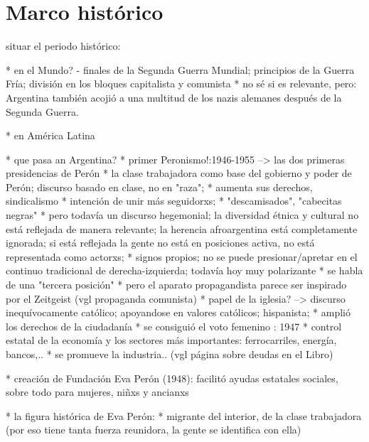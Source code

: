 \section{Marco histórico}

situar el periodo histórico:

* en el Mundo? - finales de la Segunda Guerra Mundial; principios de la Guerra Fría; división en los bloques capitalista y comunista
  * no sé si es relevante, pero: Argentina también acojió a una multitud de los nazis alemanes después de la Segunda Guerra.

* en América Latina

* que pasa an Argentina?
  * primer Peronismo!:1946-1955 --> las dos primeras presidencias de Perón
    * la clase trabajadora como base del gobierno y poder de Perón; discurso basado en clase, no en "raza";
      * aumenta sus derechos, sindicalismo
    * intención de unir más seguidorxs;
    * "descamisados", "cabecitas negras"
    * pero todavía un discurso hegemonial; la diversidad étnica y cultural no está reflejada de manera relevante; la herencia afroargentina está completamente ignorada; si está reflejada la gente no está en posiciones activa, no está representada como actorxs;
    * signos propios; no se puede presionar/apretar en el continuo tradicional de derecha-izquierda; todavía hoy muy polarizante
      * se habla de una "tercera posición"
    * pero el aparato propagandista parece ser inspirado por el Zeitgeist (vgl propaganda comunista)
    * papel de la iglesia? --> discurso inequívocamente católico; apoyandose en valores católicos; hispanista;
    * amplió los derechos de la ciudadanía
      * se consiguió el voto femenino : 1947
    * control estatal de la economía y los sectores más importantes: ferrocarriles, energía, bancos,..
      * se promueve la industria.. (vgl página sobre deudas en el Libro)

    * creación de Fundación Eva Perón (1948): facilitó ayudas estatales sociales, sobre todo para mujeres, niñxs y ancianxs

* la figura histórica de Eva Perón:
  * migrante del interior, de la clase trabajadora (por eso tiene tanta fuerza reunidora, la gente se identifica con ella)



